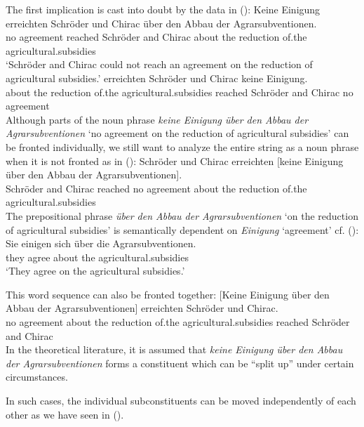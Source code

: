 The first implication is cast into doubt by the data in ():
\eal
\ex
\gll Keine Einigung erreichten Schröder und Chirac über den Abbau der Agrarsubventionen.\footnotemark\\
     no agreement reached Schröder and Chirac about the reduction of.the agricultural.subsidies\\
\glt `Schröder and Chirac could not reach an agreement on the reduction of agricultural subsidies.'
\ex 
{}     erreichten Schröder und Chirac keine Einigung.\\
     \spacebr{}about the reduction of.the agricultural.subsidies reached    Schröder and Chirac no agreement\\
\zl
Although parts of the noun phrase \emph{keine Einigung über den Abbau der Agrarsubventionen} `no agreement on the reduction
of agricultural subsidies' can be fronted individually, we still want to analyze the entire string as a noun phrase when it
is not fronted as in ():
\ea
\gll Schröder und Chirac erreichten [keine Einigung über den Abbau der Agrarsubventionen].\\
     Schröder and Chirac reached    \spacebr{}no agreement about the reduction of.the agricultural.subsidies\\
\z
The prepositional phrase \emph{über den Abbau der Agrarsubventionen} `on the reduction of agricultural subsidies' is semantically
dependent on \emph{Einigung} `agreement' cf. ():
\ea
\gll Sie einigen sich über die Agrarsubventionen.\\
     they agree \REFL{} about the agricultural.subsidies\\
\glt `They agree on the agricultural subsidies.'
\z


This word sequence can also be fronted together:
\ea
\gll {}[Keine Einigung über den Abbau der Agrarsubventionen] erreichten Schröder und Chirac.\\
     \spacebr{}no agreement about the reduction of.the agricultural.subsidies  reached Schröder and Chirac\\
\z
In the theoretical literature, it is assumed that \emph{keine Einigung über den Abbau
  der Agrarsubventionen} forms a constituent which can be ``split up'' under certain circumstances.

\noindent
In such cases, the individual subconstituents can be moved independently of each other \citep{deKuthy2002a} as we have seen in (). 

